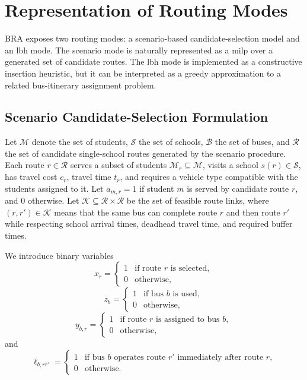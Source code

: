 \chapter{ Representation of  Routing Modes}
\label{ap:math}

BRA exposes two routing modes: a scenario-based candidate-selection model and an \gls{lbh} mode. The scenario mode is naturally represented as a \gls{milp} over a generated set of candidate routes. The \gls{lbh} mode is implemented as a constructive insertion heuristic, but it can be interpreted as a greedy approximation to a related bus-itinerary assignment problem.

\section{Scenario Candidate-Selection Formulation}

Let $\mathcal{M}$ denote the set of students, $\mathcal{S}$ the set of schools, $\mathcal{B}$ the set of buses, and $\mathcal{R}$ the set of candidate single-school routes generated by the scenario procedure. Each route $r\in\mathcal{R}$ serves a subset of students $\mathcal{M}_r \subseteq\mathcal{M}$, visits a school $s\left(r\right)\in\mathcal{S}$, has travel cost $c_r$, travel time $t_r$, and requires a vehicle type compatible with the students assigned to it. Let $a_{m,r}=1$ if student $m$ is served by candidate route $r$, and 0 otherwise. Let $\mathcal{K}\subseteq\mathcal{R}\times\mathcal{R}$ be the set of feasible route links, where $\left(r,r'\right)\in\mathcal{K}$ means that the same bus can complete route $r$ and then route $r'$ while respecting school arrival times, deadhead travel time, and required buffer times.

We introduce binary variables
\[
x_r =
\begin{cases}
1 & \text{if route } r \text{ is selected},\\
0 & \text{otherwise,}
\end{cases}
\]
\[
z_b =
\begin{cases}
1 & \text{if bus } b \text{ is used},\\
0 & \text{otherwise,}
\end{cases}
\]
\[
y_{b,r} =
\begin{cases}
1 & \text{if route } r \text{ is assigned to bus } b,\\
0 & \text{otherwise,}
\end{cases}
\]
and
\[
\ell_{b,rr'} =
\begin{cases}
1 & \text{if bus } b \text{ operates route } r' \text{ immediately after route } r,\\
0 & \text{otherwise.}
\end{cases}
\]

